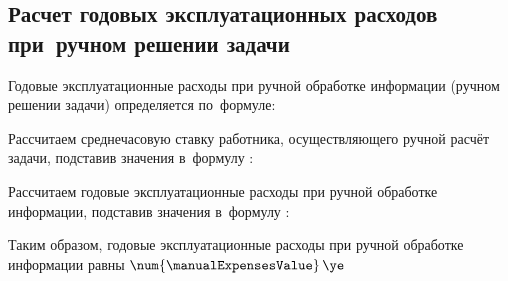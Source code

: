 \subsection{Расчет годовых эксплуатационных расходов при~ручном решении задачи}
\label{sec:economics:manualexpenses}

Годовые эксплуатационные расходы при ручной обработке информации (ручном решении задачи) определяется по~формуле:
\manualExpensesEquation

Рассчитаем среднечасовую ставку работника, осуществляющего ручной расчёт задачи, подставив значения в~формулу :
\monkerHourRateFormulaApplied

Рассчитаем годовые эксплуатационные расходы при ручной обработке информации, подставив значения в~формулу :
\manualExpensesFormulaApplied

Таким образом, годовые эксплуатационные расходы при ручной обработке информации равны \(\num{\manualExpensesValue} \, \ye\)